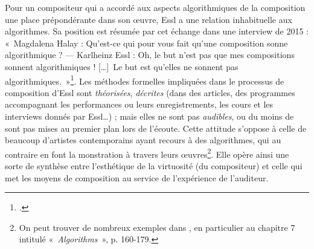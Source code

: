 \documentclass[a4paper,12pt]{article}
\newcommand{\guill}[1]{«~#1~»}
\newcommand{\zitat}[2]{\#Citation(#2)\#}
\newcommand{\tpp}[0]{[\dots]}
\begin{document}
Pour un compositeur qui a accordé aux aspects algorithmiques de la composition une place prépondérante dans son œuvre, Essl a une relation inhabituelle aux algorithmes. Sa position est résumée par cet échange dans une interview de 2015 : \guill{Magdalena Halay : Qu'est-ce qui pour vous fait qu'une composition sonne algorithmique ? --- Karlheinz Essl : Oh, le but n'est pas que mes compositions sonnent algorithmiques ! \tpp~Le but est qu'elles ne sonnent pas algorithmiques.}\footnote{\cite{composingwithalgorithms}.}.
Les méthodes formelles impliquées dans le processus de composition d'Essl sont \emph{théorisées}, \emph{décrites} (dans des articles, des programmes accompagnant les performances ou leurs enregistrements, les cours et les interviews donnés par Essl\dots) ; mais elles ne sont pas \emph{audibles}, ou du moins de sont pas mises au premier plan lors de l'écoute. Cette attitude s'oppose à celle de beaucoup d'artistes contemporains ayant recours à des algorithmes, qui au contraire en font la monstration à travers leurs œuvres\footnote{On peut trouver de nombreux exemples dans \cite{wilson2012artscience}, en particulier au chapitre 7 intitulé \guill{\emph{Algorithms}}, p. 160-179.}. Elle opère ainsi une sorte de synthèse entre l'esthétique de la virtuosité (du compositeur) et celle qui met les moyens de composition au service de l'expérience de l'auditeur.


\end{document}
